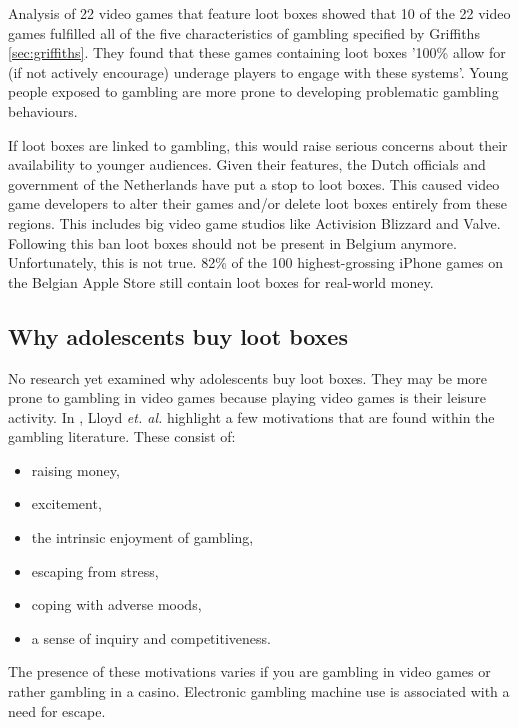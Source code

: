 \documentclass[10pt,oneside,english,a4paper]{article}
\begin{document}
	Analysis of 22 video games\cite{nature:psycho} that feature loot boxes showed that 10 of the 22 video games fulfilled all of the five characteristics of gambling specified by Griffiths \ref{sec:griffiths}.  They found that these games containing loot boxes  '100\% allow for (if not actively encourage) underage players to engage with these systems'. Young people exposed to gambling are more prone to developing problematic gambling behaviours\cite{springer:risks}. \par
	If loot boxes are linked to gambling, this would raise serious concerns about their availability to younger audiences. Given their features, the Dutch officials and government of the Netherlands have put a stop to loot boxes. This caused video game developers to alter their games and/or delete loot boxes entirely from these regions. This includes big video game studios like Activision Blizzard and Valve. Following this ban loot boxes should not be present in Belgium anymore. Unfortunately, this is not true. 82\% of the 100 highest-grossing iPhone games on the Belgian Apple Store still contain loot boxes for real-world money\cite{ban:belgium}. 

\subsection{Why adolescents buy loot boxes} \label{sec:why}

	 No research yet examined why adolescents buy loot boxes. They may be more prone to gambling in video games because playing video games is their leisure activity. In \cite{report:why}, Lloyd \emph{et. al.} highlight a few motivations that are found within the gambling literature. These consist of:

\begin{itemize}

\item raising money,
\item excitement,
\item the intrinsic enjoyment of gambling,
\item escaping from stress,
\item coping with adverse moods,
\item a sense of inquiry and competitiveness.

\end{itemize}
	
The presence of these motivations varies if you are gambling in video games or rather gambling in a casino. Electronic gambling machine use is associated with a need for escape\cite{electronicgambling}. 
\end{document}
